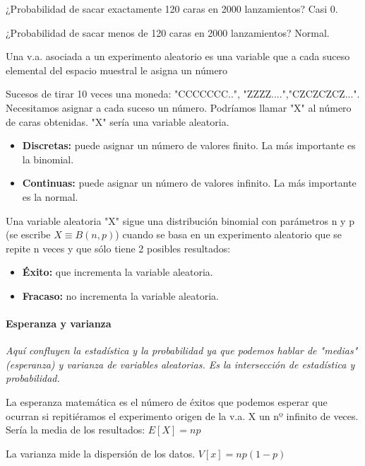 ¿Probabilidad de sacar exactamente 120 caras en 2000 lanzamientos? Casi 0.

¿Probabilidad de sacar menos de 120 caras en 2000 lanzamientos? Normal.


\begin{defn}
Una v.a. asociada a un experimento aleatorio es una variable que a cada suceso elemental del espacio muestral le asigna un número
\end{defn}
Sucesos de tirar 10 veces una moneda: "CCCCCCC..", "ZZZZ....","CZCZCZCZ...". Necesitamos asignar a cada suceso un número. 
%
Podríamos llamar "X" al número de caras obtenidas. "X" sería una variable aleatoria.

\begin{itemize}
    \item \textbf{Discretas:} puede asignar un número de valores finito. La más importante es la binomial.
    \item \textbf{Continuas: } puede asignar un número de valores infinito. La más importante es la normal.
\end{itemize}

\begin{defn}
Una variable aleatoria "X" sigue una distribución binomial con parámetros n y p (se escribe $X\equiv B(n,p)$) cuando se basa en un experimento aleatorio que se repite n veces y que sólo tiene 2 posibles resultados:
\begin{itemize}
    \item \textbf{Éxito:} que incrementa la variable aleatoria.
    \item \textbf{Fracaso:} no incrementa la variable aleatoria.
\end{itemize}
\end{defn}

\paragraph{Esperanza y varianza}
\textit{Aquí confluyen la estadística y la probabilidad ya que podemos hablar de "medias" (esperanza) y varianza de variables aleatorias. Es la intersección de estadística y probabilidad.}


La esperanza matemática es el número de éxitos que podemos esperar que ocurran si repitiéramos el experimento origen de la v.a. X un nº infinito de veces. Sería la media de los resultados: $E[X] = np$

La varianza mide la dispersión de los datos. $V[x] = np(1-p)$

